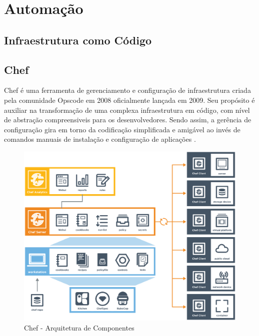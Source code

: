 \section{Automação}

\subsection{Infraestrutura como Código}

\subsection{Chef}
\label{sec:chef}

Chef é uma ferramenta de gerenciamento e configuração de infraestrutura criada
pela comunidade Opscode em 2008 oficialmente lançada em 2009. Seu propósito é
auxiliar na transformação de uma complexa infraestrutura em código, com nível
de abstração compreensiveis para os desenvolvedores. Sendo assim,
a gerência de configuração gira em torno da codificação simplificada e amigável
ao invés de comandos manuais de instalação e configuração de aplicações
\cite{sharma:2015}.

\begin{figure}[h]
  \label{fig:arch_chef}
  \centering
  \includegraphics[width=\textwidth]{figuras/arch_chef.eps}
  \caption{Chef - Arquitetura de Componentes}
\end{figure}


